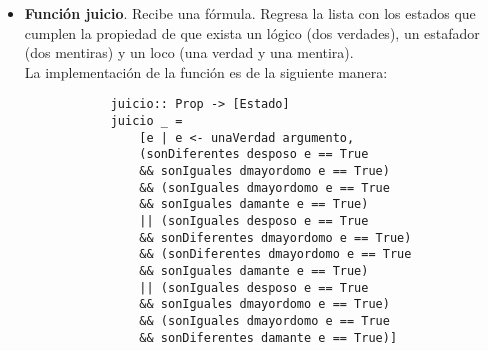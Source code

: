 \documentclass[letterpaper,11pt]{article}
\begin{document}
\begin{itemize}
        \item \textbf{Función juicio}. Recibe una fórmula. Regresa la lista 
        con los estados que cumplen la propiedad de que exista un lógico 
        (dos verdades), un estafador (dos mentiras) y un loco (una verdad y
        una mentira). \\
        La implementación de la función es de la siguiente manera:
        \begin{lstlisting}
            juicio:: Prop -> [Estado]
            juicio _ = 
                [e | e <- unaVerdad argumento, 
                (sonDiferentes desposo e == True 
                && sonIguales dmayordomo e == True) 
                && (sonIguales dmayordomo e == True 
                && sonIguales damante e == True)
                || (sonIguales desposo e == True 
                && sonDiferentes dmayordomo e == True) 
                && (sonDiferentes dmayordomo e == True 
                && sonIguales damante e == True)
                || (sonIguales desposo e == True 
                && sonIguales dmayordomo e == True) 
                && (sonIguales dmayordomo e == True 
                && sonDiferentes damante e == True)]
        \end{lstlisting}


\end{itemize}
\end{document}
